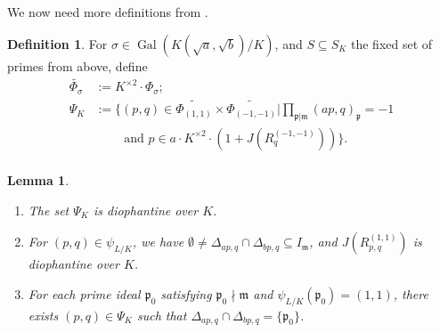 \documentclass[12pt,reqno]{amsart}
\newcommand{\mm}{\mathfrak{m}}
\newcommand{\pp}{\mathfrak{p}}
\DeclareMathOperator{\Gal}{Gal}
\newtheorem{lem}[thm]{Lemma}
\theoremstyle{definition}
\newtheorem{defn}[thm]{Definition}
\begin{document}
We now need more definitions from \cite{Park}.
\begin{defn}
For $\sigma \in \Gal(K(\sqrt{a},\sqrt{b})/K)$, and $S\subseteq S_K$ the fixed set of primes from above, define 
\begin{align*}
\widetilde{\Phi_{\sigma}} &:= K^{\times2}\cdot \Phi_{\sigma}; \\
\Psi_K &:= \Bigg\{ (p,q)\in \widetilde{\Phi_{(1,1)}}\times \widetilde{\Phi_{(-1,-1)}} | \prod_{\pp|\mm} (ap,q)_{\pp}=-1 \\
&\quad\quad\text{ and } p\in a\cdot K^{\times2}\cdot(1+J(R_q^{(-1,-1)}))\Bigg\}. \\
\end{align*}
\end{defn}


\begin{lem}\label{1,1}
$\left. \right.$
\begin{enumerate}
\item The set $\Psi_K$ is diophantine over  $K$. 
\item For $(p,q)\in \psi_{L/K}$, we have $\emptyset\not=\Delta_{ap,q}\cap \Delta_{bp,q}\subseteq I_{\mm}$, and $J(R_{p,q}^{(1,1)})$ is diophantine over  $K$. 
\item For each prime ideal $\pp_0$ satisfying $\pp_0\nmid \mm$ and $\psi_{L/K}(\pp_0)=(1,1)$, there exists $(p,q)\in \Psi_K$ such that $\Delta_{ap,q}\cap \Delta_{bp,q}=\{\pp_0\}$. 
\end{enumerate}
\end{lem}
\end{document}
